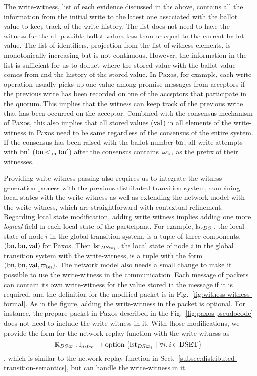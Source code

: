 The write-witness, list of each evidence discussed in the above, contains all the information from the initial write to the latest one associated with
the ballot value to keep track of the write history.
The list does not need to have the witness for the all possible ballot values less than or equal to the current ballot value. 
The list of identifiers, projection from the list of witness elements, is monotonically increasing but is not continuous.
However, the information in the list is sufficient for us to deduct where the stored value with the ballot value comes from and the history of the stored value. 
In Paxos, for example, 
each write operation usually picks up one value among promise messages from acceptors 
if the previous write has been recorded on one of the acceptors that participate in the quorum. 
This implies that the witness can keep track of the previous write that has been occurred on the acceptor. 
Combined with the consensus mechanism of Paxos,
this also implies that all stored values ($\mathrm{val}$) in all elements of the write-witness in Paxos
need to be same regardless of the consensus of the entire system. 
If the consensus has been raised with the ballot number $\mathrm{bn}$, 
all write attempts with $\mathrm{bn}'$ ($\mathrm{bn} <_{\mathrm{bn}} \mathrm{bn}'$) after the consensus contains 
$\varpi_{\mathrm{bn}}$ as  the prefix of their witnesses.


Providing write-witness-passing also requires us to integrate the witness generation process with the previous distributed transition system, combining local states with the write-witness as well as extending the network model with the write-witness, which are straightforward with contextual refinement.
Regarding local state modification, adding write witness implies adding one more \textit{logical} field in each local state of the participant. 
For example, $\mathrm{lst}_{DS_i}$, the local state of node $i$ in the global transition system, is a tuple of three components, 
$(\mathrm{bn}, \mathrm{bn}, \mathrm{val})$ for Paxos.
Then $\mathrm{lst}_{DS\varpi_i}$, the local state of node $i$ in the global transition system with the write-witness, 
is a tuple with the form $(\mathrm{bn}, \mathrm{bn}, \mathrm{val}, \varpi_{\mathrm{bn}})$.
The network model also needs a small change to make it possible to use the write-witness in the communication. 
Each message of packets can contain its own write-witness for the value stored in the message
if it is required, and the definition for the modified packet is in Fig.~\ref{fig:witness-witness-formal}.
As in the figure, adding the write-witness in the packet is optional.
For instance, the prepare packet in Paxos described in the Fig.~\ref{fig:paxos-pseudocode} does not need to include the write-witness in it.
With those modifications, we provide the form for the network replay function with the write-witness as
$$\replay_{DS\witness}: {\networklog}_{\witness} \rightarrow \mbox{option}\ \set{\lstate{DS\witness_i}~\vert~\forall i, i \in \dsset} $$
, which is similar to the network replay function in Sect.~\ref{subsec:distributed-transition-semantics}, but can handle the write-witness in it. 

